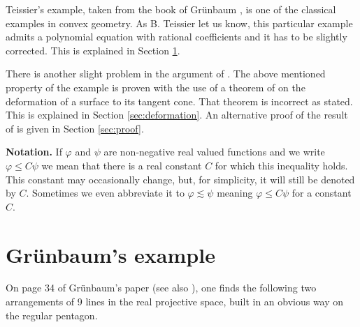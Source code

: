 \documentclass[12pt]{amsart}
\theoremstyle{definition}
\numberwithin{equation}{section}
\begin{document}
Teissier's example, taken from the book of Grünbaum \cite{Grunbook}, is one of the classical examples in convex geometry.  As B. Teissier let us know, this particular example admits a polynomial equation with rational coefficients and it has to be slightly corrected. This is explained in Section \ref{sec:grunbaum}. 

There is another slight problem in the argument of \cite{Te90}.  The above mentioned  property of the example is proven with the use of a theorem of \cite{LT79} on the deformation of a surface to its tangent cone.  That theorem is incorrect as stated.  This is explained in Section \ref{sec:deformation}.  An alternative proof of the result of \cite{Te90} is given in Section \ref{sec:proof}. 

\medskip
\noindent
\textbf{Notation.} If $\varphi$ and $\psi$ are non-negative real valued functions and we write $\varphi\le C \psi$ we mean that there is a real constant $C$ for which this inequality holds.  
This constant may occasionally change, but, for simplicity, it will still be denoted by $C.$
Sometimes we even abbreviate it to $\varphi\lesssim \psi$ meaning $\varphi\le C \psi$ for a constant $C$.  


\section{Grünbaum's example}\label{sec:grunbaum}
On page 34 of Grünbaum's paper \cite{Grunpaper} (see also \cite[pp. 93--94]{Grunbook}), one finds the following two arrangements of 9 lines in the real projective space, built in an obvious way on the regular pentagon. 
\end{document}
